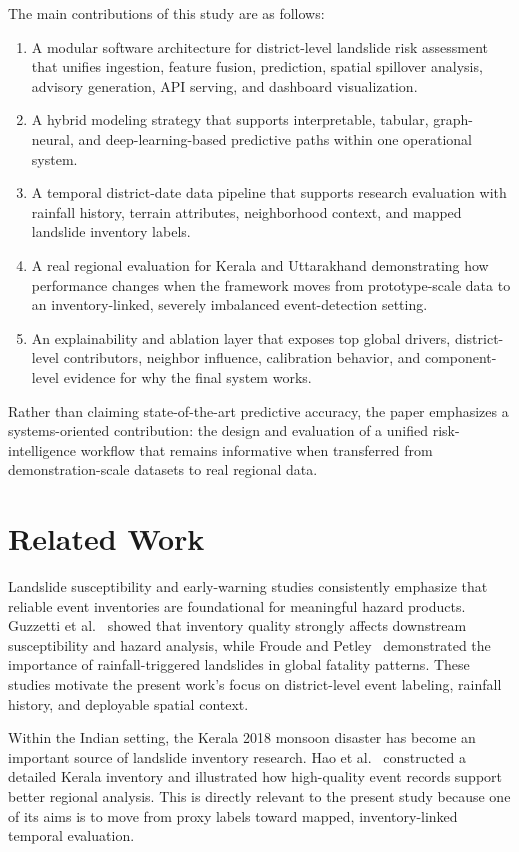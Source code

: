 \documentclass[pdflatex,sn-mathphys-num]{sn-jnl}
\begin{document}
The main contributions of this study are as follows:
\begin{enumerate}
\item A modular software architecture for district-level landslide risk assessment that unifies ingestion, feature fusion, prediction, spatial spillover analysis, advisory generation, API serving, and dashboard visualization.
\item A hybrid modeling strategy that supports interpretable, tabular, graph-neural, and deep-learning-based predictive paths within one operational system.
\item A temporal district-date data pipeline that supports research evaluation with rainfall history, terrain attributes, neighborhood context, and mapped landslide inventory labels.
\item A real regional evaluation for Kerala and Uttarakhand demonstrating how performance changes when the framework moves from prototype-scale data to an inventory-linked, severely imbalanced event-detection setting.
\item An explainability and ablation layer that exposes top global drivers, district-level contributors, neighbor influence, calibration behavior, and component-level evidence for why the final system works.
\end{enumerate}

Rather than claiming state-of-the-art predictive accuracy, the paper emphasizes a systems-oriented contribution: the design and evaluation of a unified risk-intelligence workflow that remains informative when transferred from demonstration-scale datasets to real regional data.

\section{Related Work}

Landslide susceptibility and early-warning studies consistently emphasize that reliable event inventories are foundational for meaningful hazard products. Guzzetti et al.~\cite{guzzetti2012} showed that inventory quality strongly affects downstream susceptibility and hazard analysis, while Froude and Petley~\cite{froude2018} demonstrated the importance of rainfall-triggered landslides in global fatality patterns. These studies motivate the present work's focus on district-level event labeling, rainfall history, and deployable spatial context.

Within the Indian setting, the Kerala 2018 monsoon disaster has become an important source of landslide inventory research. Hao et al.~\cite{hao2020} constructed a detailed Kerala inventory and illustrated how high-quality event records support better regional analysis. This is directly relevant to the present study because one of its aims is to move from proxy labels toward mapped, inventory-linked temporal evaluation.
\end{document}
